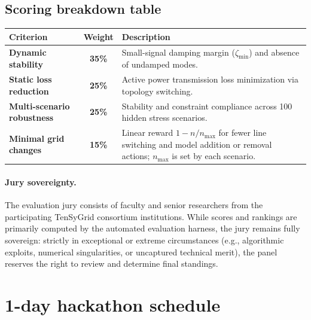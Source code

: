 \documentclass[11pt,a4paper]{article}
\begin{document}
\subsection{Scoring breakdown table}

\begin{table}[H]
  \centering
  \small
  \begin{tabularx}{\textwidth}{lcX}
    \toprule
    \textbf{\color{tgblue}Criterion}     & \textbf{\color{tgblue}Weight} & \textbf{\color{tgblue}Description}                                          \\
    \midrule
    \textbf{Dynamic stability}           & \textbf{35\%}                 & Small-signal damping margin ($\zeta_{\min}$) and absence of undamped modes. \\
    \textbf{Static loss reduction}       & \textbf{25\%}                 & Active power transmission loss minimization via topology switching.         \\
    \textbf{Multi-scenario robustness}   & \textbf{25\%}                 & Stability and constraint compliance across 100 hidden stress scenarios.     \\
    \textbf{Minimal grid changes}        & \textbf{15\%}                 & Linear reward $1-n/n_{\max}$ for fewer line switching and model addition or removal actions; $n_{\max}$ is set by each scenario. \\
    \bottomrule
  \end{tabularx}
\end{table}

\paragraph{Jury sovereignty.}
The evaluation jury consists of faculty and senior researchers from the participating TenSyGrid consortium institutions. While scores and rankings are primarily computed by the automated evaluation harness, the jury remains fully sovereign: strictly in exceptional or extreme circumstances (e.g., algorithmic exploits, numerical singularities, or uncaptured technical merit), the panel reserves the right to review and determine final standings.

\section{1-day hackathon schedule}
\end{document}
